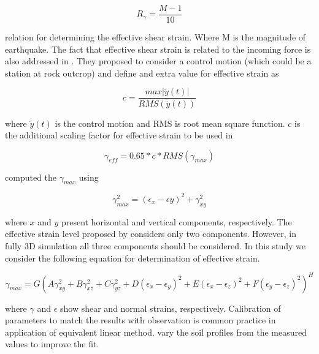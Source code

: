 \begin{equation}
R_{\gamma} = \frac{M-1}{10}
\end{equation}

 relation for determining the effective shear strain. Where M is the magnitude of earthquake. The fact that effective shear strain is related to the incoming force is also addressed in \citet{Lysmer1975}. They proposed to consider a control motion (which could be a station at rock outcrop) and define and extra value for effective strain as 
 
 \begin{equation}
c = \frac{max|\ddot{y}(t)|}{RMS(\ddot{y}(t))}
\end{equation}

where $\ddot{y}(t)$ is the control motion and RMS is root mean square function. $c$ is the additional scaling factor for effective strain to be used in 

\begin{equation}
\gamma_{eff}=0.65*c*RMS(\gamma_{max})
\end{equation}

 \citet{Lysmer1975} computed the $\gamma_{max}$ using
 
 \begin{equation}
 \gamma_{max}^{2} = (\epsilon_{x}-\epsilon{y})^2 + \gamma_{xy}^{2}
 \end{equation}
 
where $x$ and $y$ present horizontal and vertical components, respectively.  The effective strain level proposed by \citet{Lysmer1975} considers only two components. However, in fully 3D simulation all three components should be considered. In this study we consider the following equation for determination of effective strain.

 \begin{equation}
 \gamma_{max} = G(A \gamma_{xy}^{2} + B\gamma_{xz}^{2} + C\gamma_{yz}^{2} + D(\epsilon_{x}-\epsilon_{y})^2 +E(\epsilon_{x}-\epsilon_{z})^2+F(\epsilon_{y}-\epsilon_{z})^2)^H
 \end{equation}
 
 where $\gamma$ and $\epsilon$ show shear and normal strains, respectively. Calibration of parameters to match the results with observation is common practice in application of equivalent linear method.  \citet{Assimaki2006attenuation} vary the soil profiles from the measured values to improve the fit. 

 
